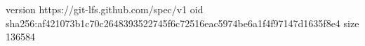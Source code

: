 version https://git-lfs.github.com/spec/v1
oid sha256:af421073b1c70c2648393522745f6c72516eac5974be6a1f4f97147d1635f8e4
size 136584
